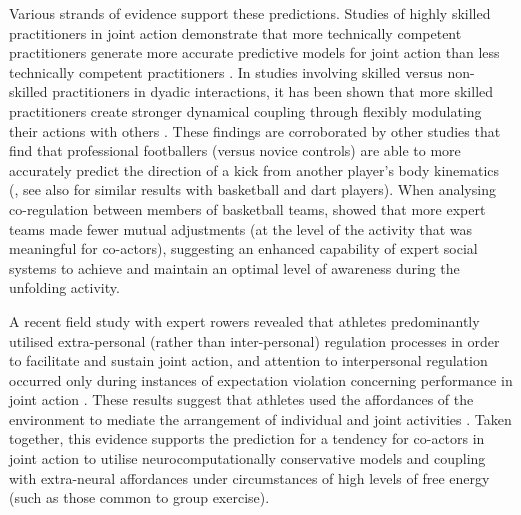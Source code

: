 \begin{CJK}{UTF8}{gbsn}
    Various strands of evidence support these predictions.  Studies of highly skilled practitioners in joint action demonstrate that more technically competent practitioners generate more accurate predictive models for joint action than less technically competent practitioners \citep{Tomeo2012,Aglioti2008,Mulligan2016}.   In studies involving skilled versus non-skilled practitioners in dyadic interactions, it has been shown that more skilled practitioners create stronger dynamical coupling through flexibly modulating their actions with others \citep{Schmidt2011,Caron2017}. These findings are corroborated by other studies that find that professional footballers (versus novice controls) are able to more accurately predict the direction of a kick from another player's body kinematics (\cite{Tomeo2012}, see also \cite{Aglioti2008,Mulligan2016} for similar results with basketball and dart players).  When analysing co-regulation between members of basketball teams, \textcite{Bourbousson2015} showed that more expert teams made fewer mutual adjustments (at the level of the activity that was meaningful for co-actors), suggesting an enhanced capability of expert social systems to achieve and maintain an optimal level of awareness during the unfolding activity.

    A recent field study with expert rowers revealed that athletes predominantly utilised
    extra-personal (rather than inter-personal) regulation processes in order to facilitate and sustain joint action, and attention to interpersonal regulation occurred only during instances of expectation violation concerning performance in joint action \citep[; for a full explanation of this study, see Appendix ~\ref{app2:theory} Section ~\ref{sect:rowerStudy}]{RKiouak2016}. These results suggest that athletes used the affordances of the environment to mediate the arrangement of individual and joint activities \citep{Bourbousson2011,Bourbousson2012}.  Taken together, this evidence supports the prediction for a tendency for co-actors in joint action to utilise neurocomputationally conservative models and coupling with extra-neural affordances under circumstances of high levels of free energy (such as those common to group exercise).



\end{CJK}
